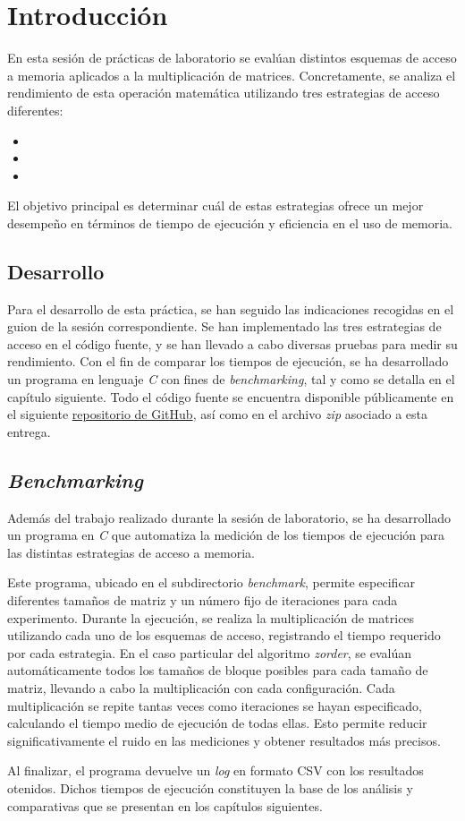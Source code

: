 \pagestyle{fancy}
\fancyhead[l]{\autorUO}
\fancyfoot[l]{\asignaturaAbbr}
\fancyfoot[r]{\fecha}

\section{Introducción}
En esta sesión de prácticas de laboratorio se evalúan distintos esquemas de acceso a memoria aplicados a la multiplicación de matrices.
Concretamente, se analiza el rendimiento de esta operación matemática utilizando tres estrategias de acceso diferentes:

\begin{itemize}
    \item \rowmajor
    \item \colmajor
    \item \zorder
\end{itemize}
El objetivo principal es determinar cuál de estas estrategias ofrece un mejor desempeño en términos de tiempo de ejecución y 
eficiencia en el uso de memoria.

\subsection{Desarrollo}
Para el desarrollo de esta práctica, se han seguido las indicaciones recogidas en el guion de la sesión correspondiente. 
Se han implementado las tres estrategias de acceso en el código fuente, y se han llevado a cabo diversas pruebas para medir su rendimiento.
Con el fin de comparar los tiempos de ejecución, se ha desarrollado un programa en lenguaje \textit{C} con fines de \textit{benchmarking}, 
tal y como se detalla en el capítulo siguiente. Todo el código fuente se encuentra disponible públicamente en el siguiente 
\href{https://github.com/rubennmg/CAP/tree/main/sesion1}{repositorio de GitHub}, así como en el archivo \textit{zip} asociado a esta entrega.

\subsection{\textit{Benchmarking}}
Además del trabajo realizado durante la sesión de laboratorio, se ha desarrollado un programa en \textit{C} que automatiza la medición 
de los tiempos de ejecución para las distintas estrategias de acceso a memoria. 

Este programa, ubicado en el subdirectorio \textit{benchmark}, permite especificar diferentes tamaños de matriz y un número fijo de iteraciones para cada experimento.
Durante la ejecución, se realiza la multiplicación de matrices utilizando cada uno de los esquemas de acceso, registrando el 
tiempo requerido por cada estrategia. En el caso particular del algoritmo \textit{zorder}, se evalúan automáticamente todos los tamaños 
de bloque posibles para cada tamaño de matriz, llevando a cabo la multiplicación con cada configuración.
Cada multiplicación se repite tantas veces como iteraciones se hayan especificado, calculando el tiempo medio de ejecución de todas ellas. 
Esto permite reducir significativamente el ruido en las mediciones y obtener resultados más precisos.

Al finalizar, el programa devuelve un \textit{log} en formato CSV con los resultados otenidos. 
Dichos tiempos de ejecución constituyen la base de los análisis y comparativas que se presentan en los capítulos siguientes.